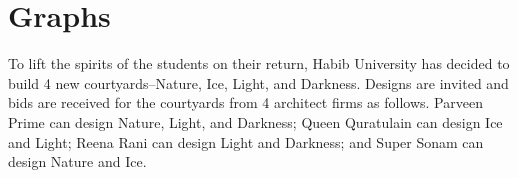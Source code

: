 \documentclass[addpoints]{exam}
\begin{document}
\begin{questions}
\begin{solution}
  \end{solution}
  
  \section*{Graphs}

\thispagestyle{empty}
\usetikzlibrary{fit,shapes}
\question To lift the spirits of the students on their return, Habib University has decided to build 4 new courtyards--Nature, Ice, Light, and Darkness. Designs are invited and bids are received for the courtyards from 4 architect firms as follows. Parveen Prime can design Nature, Light, and Darkness; Queen Quratulain can design Ice and Light; Reena Rani can design Light and Darkness; and Super Sonam can design Nature and Ice.
\end{questions}
\end{document}
